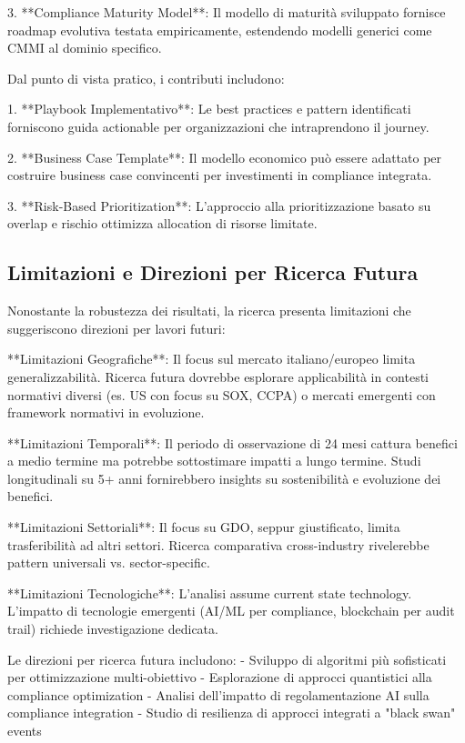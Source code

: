 3. **Compliance Maturity Model**: Il modello di maturità sviluppato fornisce roadmap evolutiva testata empiricamente, estendendo modelli generici come CMMI al dominio specifico.

Dal punto di vista pratico, i contributi includono:

1. **Playbook Implementativo**: Le best practices e pattern identificati forniscono guida actionable per organizzazioni che intraprendono il journey.

2. **Business Case Template**: Il modello economico può essere adattato per costruire business case convincenti per investimenti in compliance integrata.

3. **Risk-Based Prioritization**: L'approccio alla prioritizzazione basato su overlap e rischio ottimizza allocation di risorse limitate.

\subsection{Limitazioni e Direzioni per Ricerca Futura}

Nonostante la robustezza dei risultati, la ricerca presenta limitazioni che suggeriscono direzioni per lavori futuri:

**Limitazioni Geografiche**: Il focus sul mercato italiano/europeo limita generalizzabilità. Ricerca futura dovrebbe esplorare applicabilità in contesti normativi diversi (es. US con focus su SOX, CCPA) o mercati emergenti con framework normativi in evoluzione.

**Limitazioni Temporali**: Il periodo di osservazione di 24 mesi cattura benefici a medio termine ma potrebbe sottostimare impatti a lungo termine. Studi longitudinali su 5+ anni fornirebbero insights su sostenibilità e evoluzione dei benefici.

**Limitazioni Settoriali**: Il focus su GDO, seppur giustificato, limita trasferibilità ad altri settori. Ricerca comparativa cross-industry rivelerebbe pattern universali vs. sector-specific.

**Limitazioni Tecnologiche**: L'analisi assume current state technology. L'impatto di tecnologie emergenti (AI/ML per compliance, blockchain per audit trail) richiede investigazione dedicata.

Le direzioni per ricerca futura includono:
- Sviluppo di algoritmi più sofisticati per ottimizzazione multi-obiettivo
- Esplorazione di approcci quantistici alla compliance optimization
- Analisi dell'impatto di regolamentazione AI sulla compliance integration
- Studio di resilienza di approcci integrati a "black swan" events

